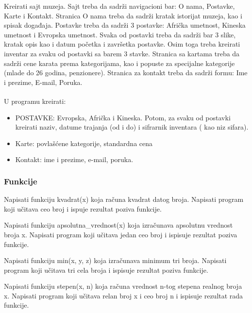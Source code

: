 \begin{primer}
Kreirati sajt muzeja. Sajt treba da sadrži navigacioni bar: O nama, Postavke, Karte i Kontakt. Stranica O nama treba da sadrži kratak istorijat muzeja, kao i spisak događaja. Postavke treba da sadrži 3 postavke: Afrička umetnost, Kineska umetnost i Evropska umetnost. Svaka od postavki treba da sadrži bar 3 slike, kratak opis kao i datum početka i završetka postavke. Osim toga treba kreirati inventar za svaku od postavki sa barem 3 stavke. Stranica sa kartama treba da sadrži cene karata prema kategorijama, kao i popuste za specijalne kategorije (mlade do 26 godina, penzionere). Stranica za kontakt treba da sadrži formu: Ime i prezime, E-mail, Poruka.\\\\
U programu kreirati:
\begin{itemize}
\item POSTAVKE: Evropska, Afrička i Kineska. Potom, za svaku od postavki kreirati naziv, datume trajanja (od i do) i sifrarnik inventara ( kao niz sifara).
\item Karte: povlašćene kategorije, standardna cena
\item Kontakt: ime i prezime, e-mail, poruka.
\end{itemize}  
\end{primer}

\subsubsection{Funkcije}

\begin{primer}
Napisati funkciju kvadrat(x) koja računa kvadrat
datog broja. Napisati program koji učitava ceo broj i ispuje rezultat poziva
funkcije.
\end{primer}

\begin{primer}
Napisati funkciju apsolutna\_vrednost(x) koja izračunava apsolutnu vrednost broja x. Napisati program koji učitava jedan ceo broj i ispisuje rezultat poziva funkcije.
\end{primer}

\begin{primer}
Napisati funkciju min(x, y, z) koja izračunava minimum tri broja. Napisati program koji učitava tri cela broja i ispisuje rezultat poziva funkcije.
\end{primer}

\begin{primer}
Napisati funkciju stepen(x, n) koja
računa vrednost n-tog stepena realnog broja x. Napisati program koji učitava
relan broj x i ceo broj n i ispisuje rezultat rada funkcije.
\end{primer}

